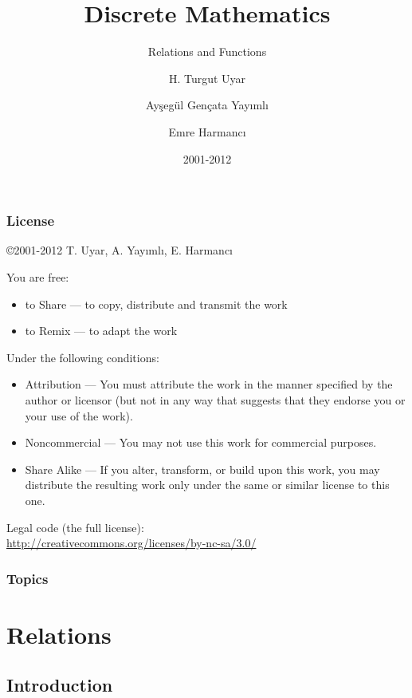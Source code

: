 \documentclass[dvipsnames]{beamer}
\title{Discrete Mathematics}
\subtitle{Relations and Functions}
\author{H. Turgut Uyar \and Ayşegül Gençata Yayımlı \and Emre Harmancı}
\date{2001-2012}
\begin{document}
\begin{frame}
  \titlepage
\end{frame}

\begin{frame}
  \frametitle{License}

  \hfill
  \copyright 2001-2012 T. Uyar, A. Yayımlı, E. Harmancı

  \vfill
  \begin{tiny}
    You are free:
    \begin{itemize}
      \item to Share — to copy, distribute and transmit the work
      \item to Remix — to adapt the work
    \end{itemize}

    Under the following conditions:
    \begin{itemize}
      \item Attribution — You must attribute the work in the manner specified by
        the author or licensor (but not in any way that suggests that they
        endorse you or your use of the work).

      \item Noncommercial — You may not use this work for commercial purposes.

      \item Share Alike — If you alter, transform, or build upon this work, you
        may distribute the resulting work only under the same or similar license
        to this one.
    \end{itemize}
  \end{tiny}

  \vfill
  Legal code (the full license):\\
  \url{http://creativecommons.org/licenses/by-nc-sa/3.0/}
\end{frame}

\begin{frame}
  \frametitle{Topics}
  \tableofcontents
\end{frame}

\section{Relations}

\subsection{Introduction}
\end{document}
